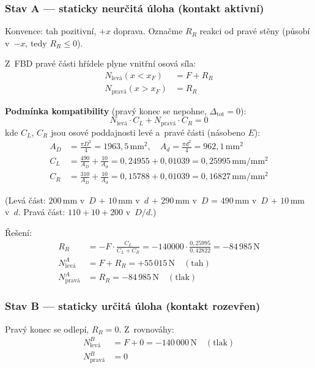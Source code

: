 \documentclass[a4paper,11pt]{article}
\newcommand{\unit}[1]{\,\mathrm{#1}}
\begin{document}
\subsubsection{Stav A — staticky neurčitá úloha (kontakt aktivní)}

Konvence: tah pozitivní, $+x$ doprava. Označme $R_R$ reakci od pravé stěny (působí v~$-x$, tedy $R_R \le 0$).

Z~FBD pravé části hřídele plyne vnitřní osová síla:
\begin{align}
    N_{\mathrm{levá}}(x < x_F) &= F + R_R \\
    N_{\mathrm{pravá}}(x > x_F) &= R_R
\end{align}

\textbf{Podmínka kompatibility} (pravý konec se nepohne, $\Delta_{\mathrm{tot}} = 0$):
\begin{equation}
    N_{\mathrm{levá}} \cdot C_L + N_{\mathrm{pravá}} \cdot C_R = 0
\end{equation}
kde $C_L$, $C_R$ jsou osové poddajnosti levé a~pravé části (násobeno $E$):
\begin{align}
    A_D &= \frac{\pi D^2}{4} = 1963{,}5\unit{mm^2}, \quad A_d = \frac{\pi d^2}{4} = 962{,}1\unit{mm^2} \\
    C_L &= \frac{490}{A_D} + \frac{10}{A_d} = 0{,}24955 + 0{,}01039 = 0{,}25995\unit{mm/mm^2} \\
    C_R &= \frac{310}{A_D} + \frac{10}{A_d} = 0{,}15788 + 0{,}01039 = 0{,}16827\unit{mm/mm^2}
\end{align}

(Levá část: $200\unit{mm}$ v~$D$ + $10\unit{mm}$ v~$d$ + $290\unit{mm}$ v~$D$ = $490\unit{mm}$ v~$D$ + $10\unit{mm}$ v~$d$. Pravá část: $110 + 10 + 200$ v~$D/d$.)

Řešení:
\begin{align}
    R_R &= -F \cdot \frac{C_L}{C_L + C_R} = -140000 \cdot \frac{0{,}25995}{0{,}42822} = -84\,985\unit{N} \\
    N_{\mathrm{levá}}^A &= F + R_R = +55\,015\unit{N} \quad (\text{tah}) \\
    N_{\mathrm{pravá}}^A &= R_R = -84\,985\unit{N} \quad (\text{tlak})
\end{align}

\subsubsection{Stav B — staticky určitá úloha (kontakt rozevřen)}

Pravý konec se odlepí, $R_R = 0$. Z~rovnováhy:
\begin{align}
    N_{\mathrm{levá}}^B &= F + 0 = -140\,000\unit{N} \quad (\text{tlak}) \\
    N_{\mathrm{pravá}}^B &= 0
\end{align}
\end{document}
